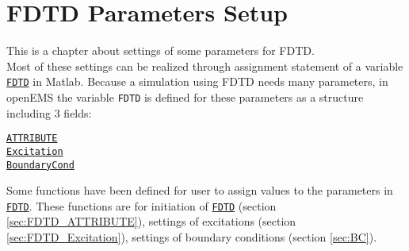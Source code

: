 \chapter{FDTD Parameters Setup}\label{chap:FDTD Parameter Setup}
This is a chapter about  settings of  some parameters for FDTD.\\
Most of these settings can be realized through  assignment statement of a variable \hyperref[para:FDTD]{\texttt{FDTD}} in Matlab.  Because a simulation using FDTD needs many parameters, in openEMS the variable \texttt{FDTD} is defined for these parameters as a structure including 3 fields:  \label{para:FDTD} %
       \begin{myindentpar}
	      \hyperref[para:FDTD_ATTRIBUTE]{\texttt{ATTRIBUTE}} \\ 
	      \hyperref[para:Excitation]{\texttt{Excitation}}  \\ 
	      \hyperref[para:BoundaryCond]{\texttt{BoundaryCond}}
       \end{myindentpar}
Some functions have been defined for user to  assign values to the parameters in \hyperref[para:FDTD]{\texttt{FDTD}}. These functions are for initiation of \hyperref[para:FDTD]{\texttt{FDTD}} (section \ref{sec:FDTD_ATTRIBUTE}), settings of  excitations (section \ref{sec:FDTD_Excitation}), settings of boundary conditions (section \ref{sec:BC}).

 

